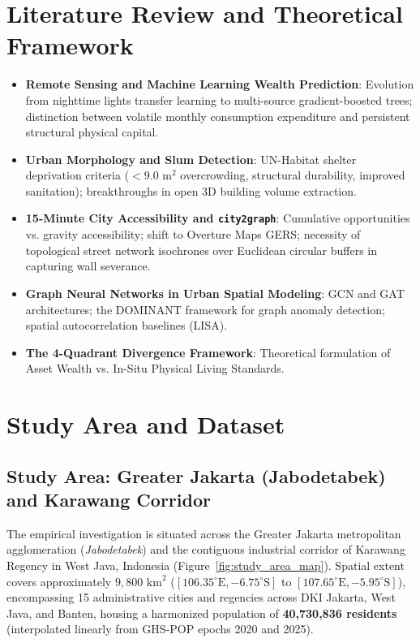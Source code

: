 \documentclass[11pt,a4paper]{article}
\begin{document}
\section{Literature Review and Theoretical Framework}
\begin{itemize}[leftmargin=*]
    \item \textbf{Remote Sensing and Machine Learning Wealth Prediction}: Evolution from nighttime lights transfer learning to multi-source gradient-boosted trees; distinction between volatile monthly consumption expenditure and persistent structural physical capital.
    \item \textbf{Urban Morphology and Slum Detection}: UN-Habitat shelter deprivation criteria ($<9.0\text{ m}^2$ overcrowding, structural durability, improved sanitation); breakthroughs in open 3D building volume extraction.
    \item \textbf{15-Minute City Accessibility and \texttt{city2graph}}: Cumulative opportunities vs. gravity accessibility; shift to Overture Maps GERS; necessity of topological street network isochrones over Euclidean circular buffers in capturing wall severance.
    \item \textbf{Graph Neural Networks in Urban Spatial Modeling}: GCN and GAT architectures; the DOMINANT framework for graph anomaly detection; spatial autocorrelation baselines (LISA).
    \item \textbf{The 4-Quadrant Divergence Framework}: Theoretical formulation of Asset Wealth vs. In-Situ Physical Living Standards.
\end{itemize}

\section{Study Area and Dataset}

\subsection{Study Area: Greater Jakarta (Jabodetabek) and Karawang Corridor}
The empirical investigation is situated across the Greater Jakarta metropolitan agglomeration (\textit{Jabodetabek}) and the contiguous industrial corridor of Karawang Regency in West Java, Indonesia (Figure~\ref{fig:study_area_map}). Spatial extent covers approximately $9,800\text{ km}^2$ ($[106.35^\circ\text{E}, -6.75^\circ\text{S}]$ to $[107.65^\circ\text{E}, -5.95^\circ\text{S}]$), encompassing 15 administrative cities and regencies across DKI Jakarta, West Java, and Banten, housing a harmonized population of \textbf{40,730,836 residents} (interpolated linearly from GHS-POP epochs 2020 and 2025).
\end{document}
